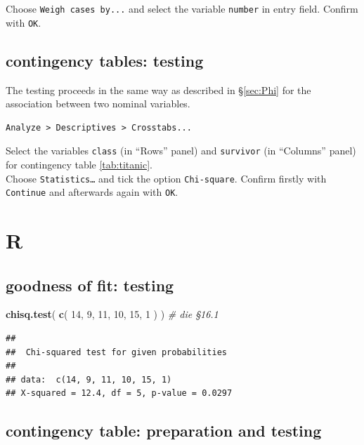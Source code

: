 \documentclass[
]{book}
\newenvironment{Shaded}{\begin{snugshade}}{\end{snugshade}}
\newcommand{\CommentTok}[1]{\textcolor[rgb]{0.56,0.35,0.01}{\textit{#1}}}
\newcommand{\DecValTok}[1]{\textcolor[rgb]{0.00,0.00,0.81}{#1}}
\newcommand{\KeywordTok}[1]{\textcolor[rgb]{0.13,0.29,0.53}{\textbf{#1}}}
\newcommand{\NormalTok}[1]{#1}
\begin{document}
Choose \texttt{Weigh\ cases\ by...} and select the variable \texttt{number} in
entry field. Confirm with \texttt{OK}.

\hypertarget{contingency-tables-testing}{%
\subsection{contingency tables: testing}\label{contingency-tables-testing}}

The testing proceeds in the same way as described in
§\ref{sec:Phi} for
the association between two nominal variables.

\begin{verbatim}
Analyze > Descriptives > Crosstabs...
\end{verbatim}

Select the variables \texttt{class} (in ``Rows'' panel) and \texttt{survivor} (in
``Columns'' panel) for
contingency table \ref{tab:titanic}.\\
Choose \texttt{Statistics\ldots{}} and tick the option \texttt{Chi-square}. Confirm firstly with
\texttt{Continue} and afterwards again with \texttt{OK}.

\hypertarget{r-16}{%
\section{R}\label{r-16}}

\hypertarget{goodness-of-fit-testing-1}{%
\subsection{goodness of fit: testing}\label{goodness-of-fit-testing-1}}

\begin{Shaded}
\begin{Highlighting}[]
\KeywordTok{chisq.test}\NormalTok{( }\KeywordTok{c}\NormalTok{( }\DecValTok{14}\NormalTok{, }\DecValTok{9}\NormalTok{, }\DecValTok{11}\NormalTok{, }\DecValTok{10}\NormalTok{, }\DecValTok{15}\NormalTok{, }\DecValTok{1}\NormalTok{ ) ) }\CommentTok{\# die §16.1}
\end{Highlighting}
\end{Shaded}

\begin{verbatim}
## 
##  Chi-squared test for given probabilities
## 
## data:  c(14, 9, 11, 10, 15, 1)
## X-squared = 12.4, df = 5, p-value = 0.0297
\end{verbatim}

\hypertarget{contingency-table-preparation-and-testing}{%
\subsection{contingency table: preparation and testing}\label{contingency-table-preparation-and-testing}}
\end{document}
